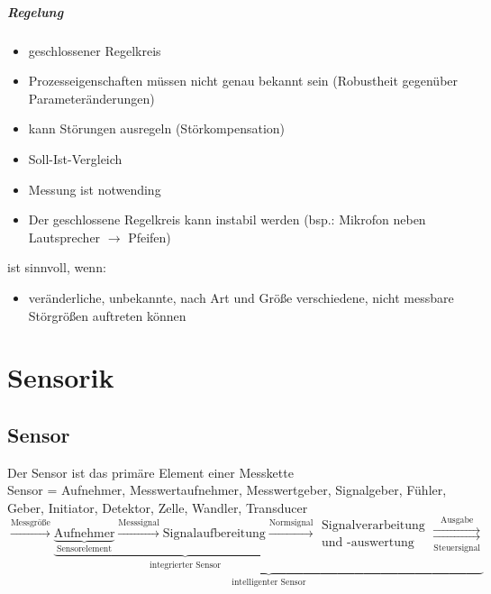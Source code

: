 \documentclass{scrreprt}
\begin{document}
\paragraph{Regelung}
\begin{itemize}
\item geschlossener Regelkreis
\item Prozesseigenschaften müssen nicht genau bekannt sein (Robustheit gegenüber Parameteränderungen)
\item kann Störungen ausregeln (Störkompensation)
\item Soll-Ist-Vergleich
\item Messung ist notwending
\item Der geschlossene Regelkreis kann instabil werden (bsp.: Mikrofon neben Lautsprecher $\to$ Pfeifen)
\end{itemize}
ist sinnvoll, wenn:
\begin{itemize}
\item veränderliche, unbekannte, nach Art und Größe verschiedene, nicht messbare Störgrößen auftreten können
\end{itemize}

\chapter{Sensorik}
\section{Sensor}
Der Sensor ist das primäre Element einer Messkette\\
Sensor = Aufnehmer, Messwertaufnehmer, Messwertgeber, Signalgeber, Fühler, Geber, Initiator, Detektor, Zelle, Wandler, Transducer\\
$\overset{\text{Messgröße}}{\longrightarrow} \underbrace{\underbrace{\underbrace{
\text{Aufnehmer}}_{\text{Sensorelement}}\overset{\text{Messsignal}}{\longrightarrow}
\text{Signalaufbereitung} \overset{\text{Normsignal}}{\longrightarrow}}_{\text{integrierter Sensor}}
\substack{\text{Signalverarbeitung}\\\text{und -auswertung}}\underset{\text{Steuersignal}}{\overset{\text{Ausgabe}}{\rightrightarrows}}}_{\text{intelligenter Sensor}}$
\end{document}
